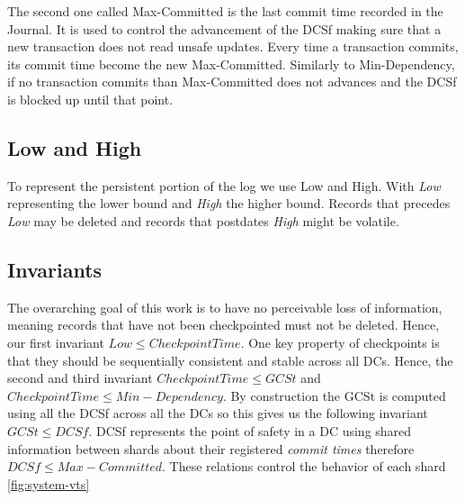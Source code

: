 \documentclass[11pt]{article}
\begin{document}
The second one called Max-Committed is the last commit time recorded in the
Journal.
It is used to control the advancement of the DCSf making sure that a new
transaction does not read unsafe updates.
Every time a transaction commits, its commit time become the new Max-Committed.
Similarly to Min-Dependency, if no transaction commits than Max-Committed does
not advances and the DCSf is blocked up until that point.

\subsection{Low and High}
\label{sec:low-high}
To represent the persistent portion of the log we use Low and High. 
With \emph{Low} representing the lower bound and \emph{High} the higher
bound.
Records that precedes \emph{Low} may be deleted and records that postdates
\emph{High} might be volatile.

\subsection{Invariants}
\label{sec:cuts-invariants}

The overarching goal of this work is to have no perceivable loss of information,
meaning records that have not been checkpointed must not be deleted.
Hence, our first invariant $\mathit{Low} \le \mathit{Checkpoint Time}$.
One key property of checkpoints is that they should be sequentially consistent
and stable across all DCs.
Hence, the second and third invariant $\mathit{Checkpoint Time} \le
\mathit{GCSt}$ and $\mathit{Checkpoint Time} \le \mathit{Min-Dependency}$.
By construction the GCSt is computed using all the DCSf across all the DCs so
this gives us the following invariant $\mathit{GCSt} \le
\mathit{DCSf}$. 
DCSf represents the point of safety in a DC using shared information between
shards about their registered \emph{commit times} therefore $\mathit{DCSf} \le
\mathit{Max-Committed}$. 
These relations control the behavior of each shard \ref{fig:system-vts}
\end{document}
